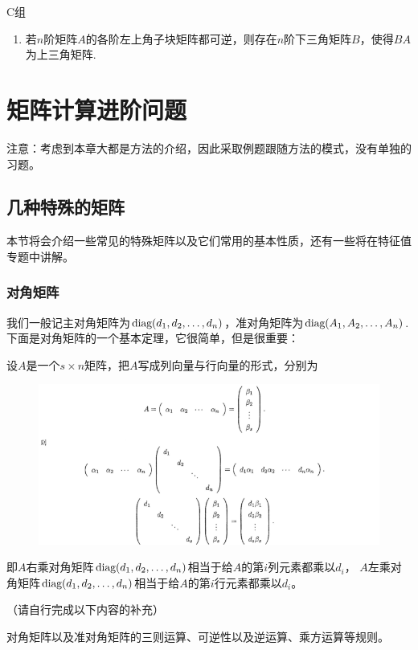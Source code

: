 \centerline{\heiti C组}
\begin{enumerate}
	\item 若$n$阶矩阵$A$的各阶左上角子块矩阵都可逆，则存在$n$阶下三角矩阵$B$，使得$BA$为上三角矩阵.
\end{enumerate}

\section{矩阵计算进阶问题}
注意：考虑到本章大都是方法的介绍，因此采取例题跟随方法的模式，没有单独的习题。
\subsection{几种特殊的矩阵}
本节将会介绍一些常见的特殊矩阵以及它们常用的基本性质，还有一些将在特征值专题中讲解。
\subsubsection{对角矩阵}
我们一般记主对角矩阵为$\textup{diag}(d_1,d_2,\dots,d_n)$，准对角矩阵为$\textup{diag}(A_1,A_2,\dots,A_n)$.
下面是对角矩阵的一个基本定理，它很简单，但是很重要：
\begin{theorem}
	设$A$是一个$s \times n$矩阵，把$A$写成列向量与行向量的形式，分别为
	\begin{figure}[h]
		\centering
		\includegraphics[scale=0.6]{6.png}
	\end{figure}
	
	即$A$右乘对角矩阵$\textup{diag}(d_1,d_2,\dots,d_n)$相当于给$A$的第$i$列元素都乘以$d_i$，
	$A$左乘对角矩阵$\textup{diag}(d_1,d_2,\dots,d_n)$相当于给$A$的第$i$行元素都乘以$d_i$。
\end{theorem}
\begin{theorem}
	（请自行完成以下内容的补充）

	对角矩阵以及准对角矩阵的三则运算、可逆性以及逆运算、乘方运算等规则。
\end{theorem}

